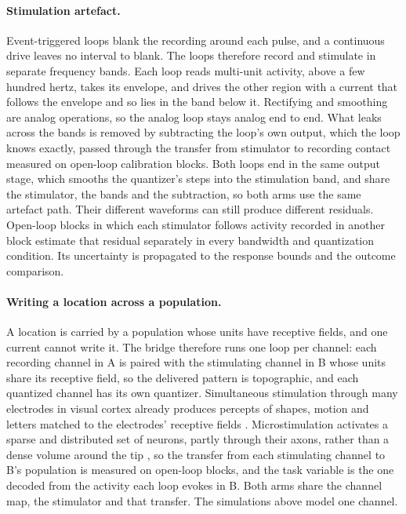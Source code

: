 \documentclass[12pt]{article}
\begin{document}
\paragraph{Stimulation artefact.} Event-triggered loops blank the recording
around each pulse, and a continuous drive leaves no interval to blank. The loops
therefore record and stimulate in separate frequency bands. Each loop reads
multi-unit activity, above a few hundred hertz, takes its envelope, and drives
the other region with a current that follows the envelope and so lies in the
band below it. Rectifying and smoothing are analog operations, so the analog
loop stays analog end to end. What leaks across the bands is removed by
subtracting the loop's own output, which the loop knows exactly, passed through
the transfer from stimulator to recording contact measured on open-loop
calibration blocks. Both loops end in the same output stage, which smooths the
quantizer's steps into the stimulation band, and share the stimulator, the
bands and the subtraction, so both arms use the same artefact path. Their different waveforms can still
produce different residuals. Open-loop blocks in which each stimulator follows
activity recorded in another block estimate that residual separately in every
bandwidth and quantization condition. Its uncertainty is propagated to the
response bounds and the outcome comparison.

\paragraph{Writing a location across a population.} A location is carried by a
population whose units have receptive fields, and one current cannot write it.
The bridge therefore runs one loop per channel: each recording channel in A is
paired with the stimulating channel in B whose units share its receptive field,
so the delivered pattern is topographic, and each quantized channel has its own
quantizer. Simultaneous stimulation through many electrodes in visual cortex
already produces percepts of shapes, motion and letters matched to the
electrodes' receptive fields \citep{chen2020}. Microstimulation activates a
sparse and distributed set of neurons, partly through their axons, rather than
a dense volume around the tip \citep{histed2009}, so the transfer from each
stimulating channel to B's population is measured on open-loop blocks, and the
task variable is the one decoded from the activity each loop evokes in B.
Both arms share the channel map, the stimulator and that transfer. The
simulations above model one channel.
\end{document}
